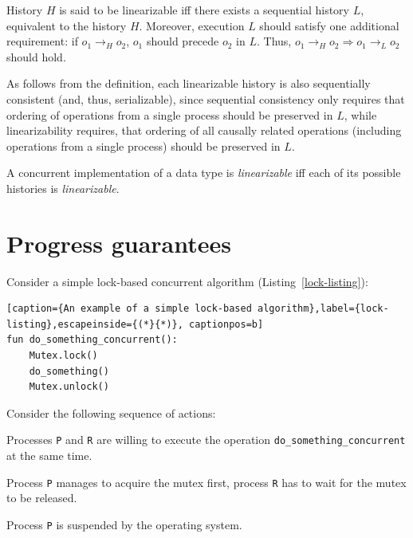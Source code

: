 \documentclass[times, dvipsnames,%
               languages={russian,english} %
              ]{itmo-student-thesis}
\begin{document}
\begin{itemize}
    History $H$ is said to be linearizable iff there exists a sequential history $L$, equivalent to the history $H$. Moreover, execution $L$ should satisfy one additional requirement: if $o_1 \rightarrow_H o_2$, $o_1$ should precede $o_2$ in $L$. Thus, $o_1 \rightarrow_H o_2 \Rightarrow o_1 \rightarrow_L o_2$ should hold.
    
     As follows from the definition, each linearizable history is also sequentially consistent (and, thus, serializable), since sequential consistency only requires that ordering of operations from a single process should be preserved in $L$, while linearizability requires, that ordering of all causally related operations (including operations from a single process) should be preserved in $L$.
     
     A concurrent implementation of a data type is \emph{linearizable} iff each of its possible histories is \emph{linearizable}.
\end{itemize} 

\section{Progress guarantees}
\label{section-guarantees}

Consider a simple lock-based concurrent algorithm (Listing~\ref{lock-listing}):

\renewcommand{\lstlistingname}{Listing}
\begin{lstlisting}[caption={An example of a simple lock-based algorithm},label={lock-listing},escapeinside={(*}{*)}, captionpos=b]
fun do_something_concurrent():
    Mutex.lock()
    do_something()
    Mutex.unlock()
\end{lstlisting}

Consider the following sequence of actions:

\begin{nenum}
    \item Processes \texttt{P} and \texttt{R} are willing to execute the operation \texttt{do\_something\_concurrent} at the same time.
    
    \item Process \texttt{P} manages to acquire the mutex first, process \texttt{R} has to wait for the mutex to be released.
    
    \item Process \texttt{P} is suspended by the operating system.
\end{nenum}

\bigbreak
\end{document}
